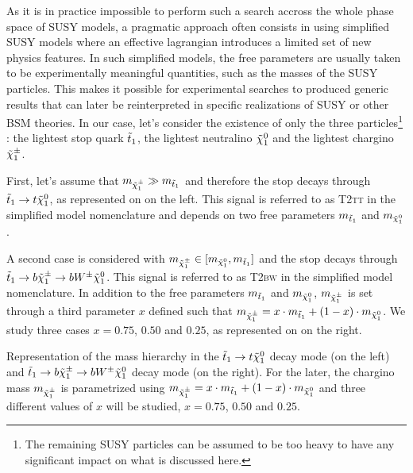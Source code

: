 
        As it is in practice impossible to perform such a search accross the whole phase
        space of SUSY models, a pragmatic approach often consists in using simplified SUSY
        models where an
        effective lagrangian introduces a limited set of new physics features. In such
        simplified models, the free parameters are usually taken to be experimentally
        meaningful quantities, such as the masses of the SUSY particles. This makes
        it possible for experimental searches to produced generic results that can later
        be reinterpreted in specific realizations of SUSY \cite{LiemSMS, SmodelS}
        or other BSM theories. In our case, let's consider the existence of only the three
        particles\footnote{The remaining SUSY particles can be assumed to be too heavy to
        have any significant impact on what is discussed here.} : the lightest stop quark
        $\tilde{t}_1$, the lightest neutralino $\tilde{\chi}_1^0$ and the lightest chargino $
        \tilde{\chi}_1^\pm$.

        First, let's assume that $m_{\tilde{\chi}_1^\pm} \gg m_{\tilde{t}_1}$ and therefore the
        stop decays through $\tilde{t}_1 \rightarrow t \tilde{\chi}_1^0$, as represented on
         on the left. This signal is referred to as \textsc{T2tt}
        in the simplified model nomenclature and depends on two free parameters
        $m_{\tilde{t}_1}$ and $m_{\tilde{\chi}_1^0}$.

        A second case is considered with $m_{\tilde{\chi}_1^\pm} \in [m_{\tilde{\chi}_1^0},
        m_{\tilde{t}_1}]$ and the stop decays through $\tilde{t}_1 \rightarrow b \tilde{\chi}_1^\pm
        \rightarrow b W^{\pm} \tilde{\chi}_1^0$. This signal is referred to as \textsc{T2bw}
        in the simplified model nomenclature. In addition to the free  parameters
        $m_{\tilde{t}_1}$ and $m_{\tilde{\chi}_1^0}$, $m_{\tilde{\chi}_1^\pm}$ is set through a
        third parameter $x$ defined such that $m_{\tilde{\chi}_1^\pm} = x \cdot m_{\tilde{t}_1}
        + (1 - x) \cdot m_{\tilde{\chi}_1^0}$. We study three cases $x = 0.75$, $0.50$
        and $0.25$, as represented on  on the right.

                     {Representation of the mass hierarchy in the $\tilde{t}_1 \rightarrow t
                     \tilde{\chi}_1^0$ decay mode (on the left) and $\tilde{t}_1 \rightarrow b
                     \tilde{\chi}_1^\pm \rightarrow b W^{\pm} \tilde{\chi}_1^0 $ decay mode (on the
                     right). For the later, the chargino mass $m_{\tilde{\chi}_1^\pm}$ is
                     parametrized using $m_{\tilde{\chi}_1^\pm} = x \cdot m_{\tilde{t}_1}
                     + (1 - x) \cdot m_{\tilde{\chi}_1^0}$ and three different values of $x$ will
                     be studied, $x = 0.75$, $0.50$ and $0.25$.}

